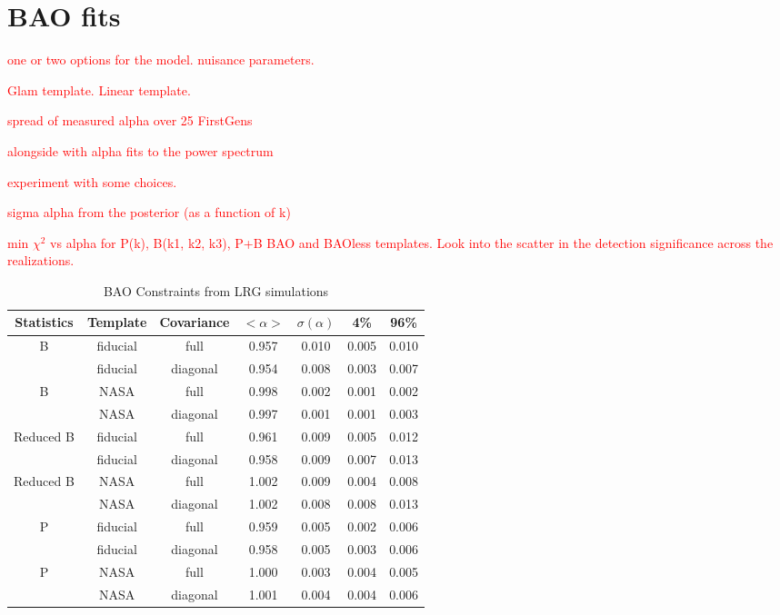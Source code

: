 \section{BAO fits}
\label{sec:fits}

\textcolor{red}{one or two options for the model. nuisance parameters.}

\textcolor{red}{Glam template. Linear template.}

\textcolor{red}{spread of measured alpha over 25 FirstGens}

\textcolor{red}{alongside with alpha fits to the power spectrum}

\textcolor{red}{experiment with some choices.}

\textcolor{red}{sigma alpha from the posterior (as a function of k)}

\textcolor{red}{min $\chi^{2}$ vs alpha for P(k), B(k1, k2, k3), P+B BAO and BAOless templates. Look into the scatter in the detection significance across the realizations.}



\begin{table*}
\caption{‌BAO Constraints from LRG simulations}
\begin{center}
\begin{tabular}{ccccccc}
Statistics & Template & Covariance &$< \alpha >$ & $\sigma(\alpha) $ & 4\%&96\%\\
\hline
                            B  &   fiducial & full & 0.957 & 0.010& 0.005 & 0.010\\ 
 &   fiducial & diagonal & 0.954 & 0.008 &0.003 &0.007\\ 
\hline
                            B  &       NASA & full & 0.998 & 0.002& 0.001 & 0.002\\ 
 &       NASA & diagonal & 0.997 & 0.001 &0.001 &0.003\\ 
\hline
                    Reduced B  &   fiducial & full & 0.961 & 0.009& 0.005 & 0.012\\ 
 &   fiducial & diagonal & 0.958 & 0.009 &0.007 &0.013\\ 
\hline
                    Reduced B  &       NASA & full & 1.002 & 0.009& 0.004 & 0.008\\ 
 &       NASA & diagonal & 1.002 & 0.008 &0.008 &0.013\\ 
\hline
                            P  &   fiducial & full & 0.959 & 0.005& 0.002 & 0.006\\ 
 &   fiducial & diagonal & 0.958 & 0.005 &0.003 &0.006\\ 
\hline
                            P  &       NASA & full & 1.000 & 0.003& 0.004 & 0.005\\ 
 &       NASA & diagonal & 1.001 & 0.004 &0.004 &0.006
\end{tabular}
\end{center}
\label{default}
\end{table*}


